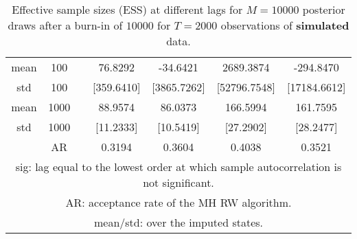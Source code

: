 {\begin{table}
\begin{tabular}{ccc cc cc}
mean & 100 &  & 76.8292  & -34.6421  & 2689.3874  & -294.8470  \\ 
std & 100 &  & [359.6410]  & [3865.7262]  & [52796.7548]  & [17184.6612]  \\  [1ex]
mean & 1000 &  & 88.9574  & 86.0373  & 166.5994  & 161.7595  \\ 
std & 1000 &  & [11.2333]  & [10.5419]  & [27.2902]  & [28.2477]  \\  [1ex]
 & AR &  & 0.3194  & 0.3604  & 0.4038  & 0.3521  \\  [1ex]
\hline 
\multicolumn{7}{p{11cm}}{\footnotesize{sig: lag equal to the lowest order at which sample autocorrelation is not significant.}}  \\ 
\multicolumn{7}{p{11cm}}{\footnotesize{AR: acceptance rate of the MH RW algorithm.}}  \\ 
\multicolumn{7}{p{11cm}}{\footnotesize{mean/std: over the imputed states.}}  \\ 
\end{tabular}
 \caption{Effective sample sizes (ESS) at different lags  for $M=10000$ posterior draws after a burn-in of $10000$ for $T=2000$ observations of \textbf{simulated} data.}
\label{tab:ESS}  
\end{table}
}